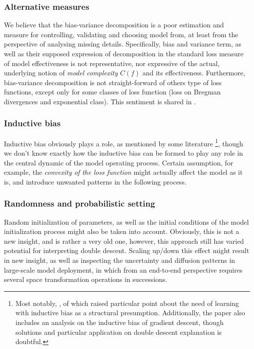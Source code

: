 \documentclass[
  journal=largetwo,
  year=2025,
  volume=37,
]{cup-journal}
\begin{document}
\subsubsection{Alternative measures}
We believe that the bias-variance decomposition is a poor estimation and measure for controlling, validating and choosing model from, at least from the perspective of analysing missing details. Specifically, bias and variance term, as well as their supposed expression of decomposition in the standard loss measure of model effectiveness is not representative, nor expressive of the actual, underlying notion of \textit{model complexity} $C(f)$ and its effectiveness. Furthermore, bias-variance decomposition is not straight-forward of others type of loss functions, except only for some classes of loss function (loss on Bregman divergences and exponential class). This sentiment is shared in \cite{brown2024biasvariance}.

\subsubsection{Inductive bias}
Inductive bias obviously plays a role, as mentioned by some literature \footnote{Most notably, \cite{lafon_understanding_2024}, of which raised particular point about the need of learning with inductive bias as a structural presumption. Additionally, the paper also includes an analysis on the inductive bias of gradient descent, though solutions and particular application on double descent explanation is doubtful.}, though we don't know exactly how the inductive bias can be formed to play any role in the central dynamic of the model operating process. Certain assumption, for example, the \textit{convexity of the loss function} might actually affect the model as it is, and introduce unwanted patterns in the following process. 
\subsubsection{Randomness and probabilistic setting}
Random initialization of parameters, as well as the initial conditions of the model initialization process might also be taken into account. Obviously, this is not a new insight, and is rather a very old one, however, this approach still has varied potential for interpreting double descent. Scaling up/down this effect might result in new insight, as well as inspecting the uncertainty and diffusion patterns in large-scale model deployment, in which from an end-to-end perspective requires several space transformation operations in successions.
\end{document}
